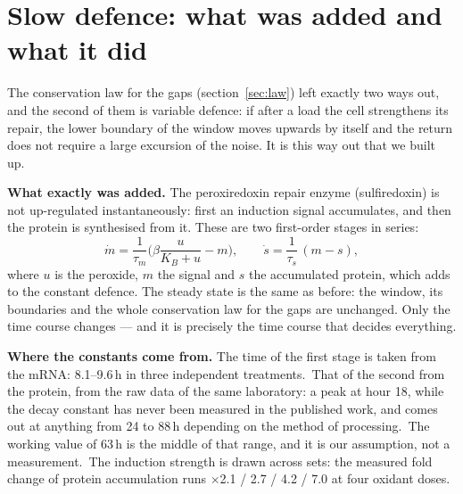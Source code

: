 \section{Slow defence: what was added and what it did}\label{sec:slow}

The conservation law for the gaps (section~\ref{sec:law}) left exactly two ways out, and the second of them is variable defence: if after a load the cell strengthens its repair, the lower boundary of the window moves upwards by itself and the return does not require a large excursion of the noise. It is this way out that we built up.

\textbf{What exactly was added.} The peroxiredoxin repair enzyme (sulfiredoxin) is not up-regulated instantaneously: first an induction signal accumulates, and then the protein is synthesised from it. These are two first-order stages in series:
\[\dot m=\frac{1}{\tau_m}\Big(\beta\frac{u}{K_B+u}-m\Big),\qquad \dot s=\frac{1}{\tau_s}\,(m-s),\]
where $u$ is the peroxide, $m$ the signal and $s$ the accumulated protein, which adds to the constant defence. The steady state is the same as before: the window, its boundaries and the whole conservation law for the gaps are unchanged. Only the time course changes --- and it is precisely the time course that decides everything.

\textbf{Where the constants come from.} The time of the first stage is taken from the mRNA: 8.1--9.6\,h in three independent treatments.\tS\ That of the second from the protein, from the raw data of the same laboratory: a peak at hour 18, while the decay constant has never been measured in the published work, and comes out at anything from 24 to 88\,h depending on the method of processing.\tS\ The working value of 63\,h is the middle of that range, and it is our assumption, not a measurement.\tD\ The induction strength is drawn across sets: the measured fold change of protein accumulation runs $\times$2.1 / 2.7 / 4.2 / 7.0 at four oxidant doses.\tS

